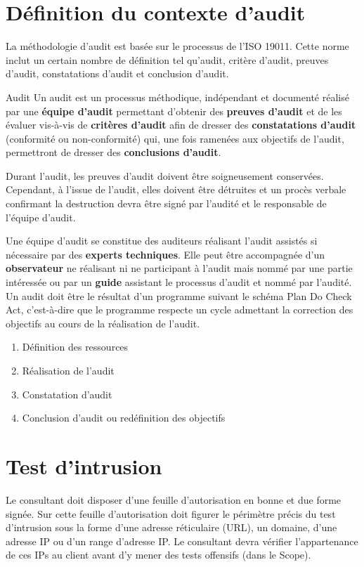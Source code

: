 \documentclass[twoside,a4paper,12pt,titlepage]{book}
\begin{document}
\chapter*{Définition du contexte d'audit}
\begin{Pre}La méthodologie d'audit est basée sur le processus de l'ISO 19011. Cette norme inclut un certain nombre de définition tel qu'audit, critère d'audit, preuves d'audit, constatations d'audit et conclusion d'audit.\end{Pre}
\begin{Define}{Audit}
Un audit est un processus méthodique, indépendant et documenté réalisé par une \textbf{équipe d'audit} permettant d'obtenir des \textbf{preuves d'audit} et de les évaluer vis-à-vis de \textbf{critères d'audit} afin de dresser des \textbf{constatations d'audit} (conformité ou non-conformité) qui, une fois ramenées aux objectifs de l'audit, permettront de dresser des \textbf{conclusions d'audit}.
\end{Define}
\begin{Warning}
Durant l'audit, les preuves d'audit doivent être soigneusement conservées. Cependant, à l'issue de l'audit, elles doivent être détruites et un procès verbale confirmant la destruction devra être signé par l'audité et le responsable de l'équipe d'audit.
\end{Warning}
Une équipe d'audit se constitue des auditeurs réalisant l'audit assistés si nécessaire par des \textbf{experts techniques}. Elle peut être accompagnée d'un \textbf{observateur} ne réalisant ni ne participant à l'audit mais nommé par une partie intéressée ou par un \textbf{guide} assistant le processus d'audit et nommé par l'audité.\newline\newline
Un audit doit être le résultat d'un programme suivant le schéma Plan Do Check Act, c'est-à-dire que le programme respecte un cycle admettant la correction des objectifs au cours de la réalisation de l'audit. \begin{enumerate}
\item Définition des ressources
\item Réalisation de l'audit
\item Constatation d'audit
\item Conclusion d'audit ou redéfinition des objectifs
\end{enumerate}



\chapter{Test d'intrusion}
\begin{Pre}Le consultant doit disposer d'une feuille d'autorisation en bonne et due forme signée. Sur cette feuille d'autorisation doit figurer le périmètre précis du test d'intrusion sous la forme d'une adresse réticulaire (\gls{URL}), un domaine, d'une adresse IP ou d'un range d'adresse IP. Le consultant devra vérifier l'appartenance de ces IPs au client avant d'y mener des tests offensifs (dans le Scope).\end{Pre}
\end{document}
